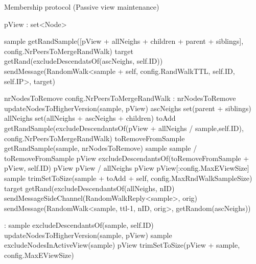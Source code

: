 \begin{algorithm}
\label{alg:memb:passive_view_maint}
\caption{Membership protocol (Passive view maintenance)}
\begin{algorithmic}[1]
    
    \asdstate
        \State pView : set<Node> \label{alg:memb:passive_view_maint:state}
    \asdend

     \label{alg:memb:passive_view_maint:walk_trig}
        \State sample \asdassign getRandSample([pView + allNeighs + children + parent + siblings], config.NrPeersToMergeRandWalk)
        \State target \asdassign getRand(excludeDescendatsOf(ascNeighs, self.ID))
        \State sendMessage(RandomWalk<sample + self, config.RandWalkTTL, self.ID, self.IP>, target)
    \asdend

     \label{alg:memb:passive_view_maint:walk_rec}
        \State nrNodesToRemove \asdassign config.NrPeersToMergeRandWalk
        :
            \State nrNodesToRemove 
        \EndIf
        \State updateNodesToHigherVersion(sample, pView) \label{alg:memb:passive_view_maint:walk_rec_merge_start}
        \State ascNeighs \asdassign set(parent + siblings)
        \State allNeighs \asdassign set(allNeighs + ascNeighs + children)
        \State toAdd \asdassign getRandSample(excludeDescendantsOf(pView + allNeighs / sample,self.ID), config.NrPeersToMergeRandWalk)
        \State toRemoveFromSample \asdassign getRandSample(sample, nrNodesToRemove)
        \State sample \asdassign sample / toRemoveFromSample
        \State pView \asdassign excludeDescendantsOf(toRemoveFromSample + pView, self.ID)  
        \State pView \asdassign pView / allNeighs
        \State pView \asdassign pView[:config.MaxEViewSize]
        \State sample  \asdassign trimSetToSize(sample + toAdd + self, config.MaxRndWalkSampleSize) \label{alg:memb:passive_view_maint:walk_rec_merge_end}
        \State target \asdassign getRand(excludeDescendantsOf(allNeighs, nID)
         \label{alg:memb:passive_view_maint:walk_rec_send}
            \State sendMessageSideChannel(RandomWalkReply<sample>, orig)
        \Else
            \State sendMessage(RandomWalk<sample, ttl-1, nID, orig>, getRandom(ascNeighs))
        \EndIf \label{alg:memb:passive_view_maint:walk_rec_send_end}
    \asdend

    : \label{alg:memb:passive_view_maint:walk_reply_recv_start}
        \State sample \asdassign excludeDescendantsOf(sample, self.ID)
        \State updateNodesToHigherVersion(sample, pView)
        \State sample \asdassign excludeNodesInActiveView(sample)
        \State pView \asdassign trimSetToSize(pView + sample, config.MaxEViewSize) \label{alg:memb:passive_view_maint:walk_reply_recv_end}
    \asdend



\end{algorithmic}
\end{algorithm}
